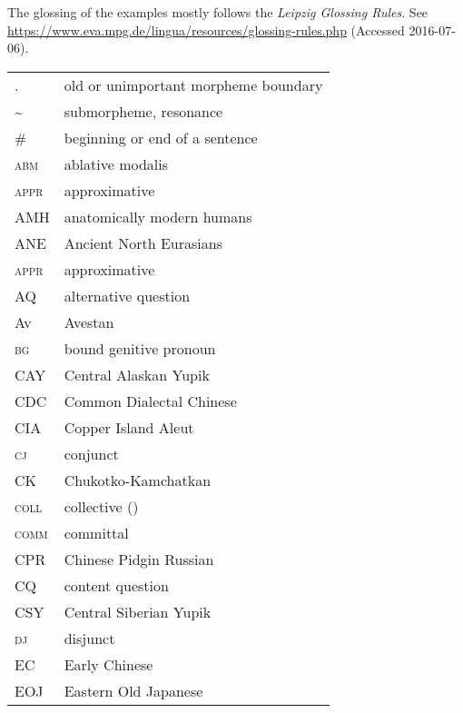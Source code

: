 
The {glossing} of the examples mostly follows the \textit{Leipzig Glossing Rules}. {See \url{https://www.eva.mpg.de/lingua/resources/glossing-rules.php} (Accessed 2016-07-06).}
\\ 

\medskip 

\begin{tabularx}{.45\textwidth}{lQ} 
. & old or unimportant morpheme boundary\\
{\textasciitilde} & {submorpheme}, {resonance}\\
\# & beginning or end of a sentence\\
\textsc{abm} & ablative modalis \citep{Miyaoka2012}\\
\textsc{appr} & approximative\\
AMH & {anatomically modern humans}\\
ANE & {Ancient North Eurasians}\\
\textsc{appr} & approximative \citep{Shigeno2010}\\
AQ & {alternative question}\\
Av & {Avestan}\\
\textsc{bg} & bound genitive pronoun \citep{Huang1996}\\
CAY & Central Alaskan {Yupik}\\
CDC & Common Dialectal {Chinese} \citep{Norman2014}\\
CIA & Copper Island {Aleut}\\
\textsc{cj} & conjunct\\
CK & {Chukotko-Kamchatkan}\\
\textsc{coll} & collective (\citealt{KämpfeVolodin1995})\\
\textsc{comm} & committal\\
CPR & {Chinese} Pidgin {Russian}\\
CQ & {content question}\\
CSY & Central Siberian {Yupik}\\
\textsc{dj} & disjunct\\
EC & Early {Chinese} \citep{Norman2014}\\
EOJ & Eastern {Old Japanese}\\
\end{tabularx}
